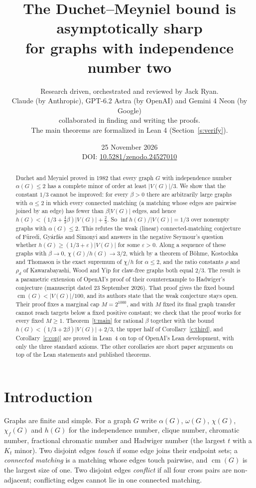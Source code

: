 \documentclass[11pt]{article}
\title{The Duchet--Meyniel bound is asymptotically sharp\\ for graphs with independence number two}
\author{Research driven, orchestrated and reviewed by Jack Ryan.\\
Claude (by Anthropic), GPT-6.2 Astra (by OpenAI) and Gemini 4 Neon (by Google)\\
collaborated in finding and writing the proofs.\\
The main theorems are formalized in Lean 4 (Section~\ref{s:verify}).}
\date{25 November 2026\\ DOI: \href{https://doi.org/10.5281/zenodo.24527010}{10.5281/zenodo.24527010}}
\theoremstyle{definition}\newtheorem{conjecture}[theorem]{Conjecture}
\theoremstyle{remark}\newtheorem{remark}[theorem]{Remark}
\newcommand{\cm}{\operatorname{cm}}
\newcommand{\eps}{\varepsilon}
\begin{document}
\maketitle

\begin{abstract}
Duchet and Meyniel proved in 1982 that every graph $G$ with independence number $\alpha(G)\le2$ has a complete minor of
order at least $|V(G)|/3$. We show that the constant $1/3$ cannot be improved: for every $\beta>0$ there are arbitrarily
large graphs with $\alpha\le2$ in which every connected matching (a matching whose edges are pairwise joined by an edge) has
fewer than $\beta|V(G)|$ edges, and hence $h(G)<(1/3+\tfrac43\beta)|V(G)|+\tfrac23$.
So $\inf h(G)/|V(G)|=1/3$ over nonempty graphs with $\alpha(G)\le2$. This refutes the weak (linear)
connected-matching conjecture of F\"uredi, Gy\'arf\'as and Simonyi and answers in the negative Seymour's
question whether $h(G)\ge(1/3+\eps)|V(G)|$ for some $\eps>0$. Along a sequence of these graphs with $\beta\to0$,
$\chi(G)/h(G)\to3/2$, which by a theorem of B\"ohme, Kostochka and Thomason is the exact supremum of $\chi/h$ for
$\alpha\le2$, and the ratio constants $\rho$ and $\rho_d$ of Kawarabayashi, Wood and Yip for claw-free graphs both equal
$2/3$. The result is a parametric extension of OpenAI's proof of their counterexample to Hadwiger's conjecture (manuscript
dated 23 September 2026). That proof gives the fixed bound $\cm(G)<|V(G)|/100$, and its authors state that the weak
conjecture stays open. Their proof fixes a marginal cap $M=2^{1000}$, and with $M$ fixed its final graph transfer cannot
reach targets below a fixed positive constant; we check that the proof works for every fixed $M\ge1$. Theorem~\ref{t:main}
for rational $\beta$ together with the bound $h(G)<(1/3+2\beta)|V(G)|+2/3$, the upper half of Corollary~\ref{c:third},
and Corollary~\ref{c:conj} are proved in Lean~4 on top of OpenAI's Lean development, with only the three standard axioms.
The other corollaries are short paper arguments on top of the Lean statements and published theorems.
\end{abstract}

\section{Introduction}
Graphs are finite and simple. For a graph $G$ write $\alpha(G)$, $\omega(G)$, $\chi(G)$, $\chi_f(G)$ and $h(G)$ for the
independence number, clique number, chromatic number, fractional chromatic number and Hadwiger number (the largest $t$ with a
$K_t$ minor). Two disjoint edges \emph{touch} if some edge joins their endpoint sets; a \emph{connected matching} is a matching
whose edges touch pairwise, and $\cm(G)$ is the largest size of one. Two disjoint edges \emph{conflict} if all four cross pairs
are non-adjacent; conflicting edges cannot lie in one connected matching.
\end{document}
